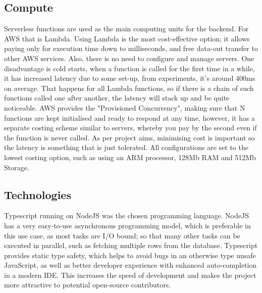 \subsection{Compute}
Serverless functions are used as the main computing units for the backend. For AWS that is Lambda. Using Lambda is the most cost-effective option; it allows paying only for execution time down to milliseconds, and free data-out transfer to other AWS services. Also, there is no need to configure and manage servers. One disadvantage is cold starts, when a function is called for the first time in a while, it has increased latency due to some set-up, from experiments, it's around 400ms on average. That happens for all Lambda functions, so if there is a chain of such functions called one after another, the latency will stack up and be quite noticeable. AWS provides the "Provisioned Concurrency", making sure that N functions are kept initialised and ready to respond at any time, however, it has a separate costing scheme similar to servers, whereby you pay by the second even if the function is never called. As per project aims, minimising cost is important so the latency is something that is just tolerated. All configurations are set to the lowest costing option, such as using an ARM processor, 128Mb RAM and 512Mb Storage.
\subsection{Technologies}
Typescript running on NodeJS was the chosen programming language. NodeJS has a very easy-to-use asynchronous programming model, which is preferable in this use case, as most tasks are I/O bound; so that many other tasks can be executed in parallel, such as fetching multiple rows from the database. Typescript provides static type safety, which helps to avoid bugs in an otherwise type unsafe JavaScript, as well as better developer experience with enhanced auto-completion in a modern IDE. This increases the speed of development and makes the project more attractive to potential open-source contributors.
